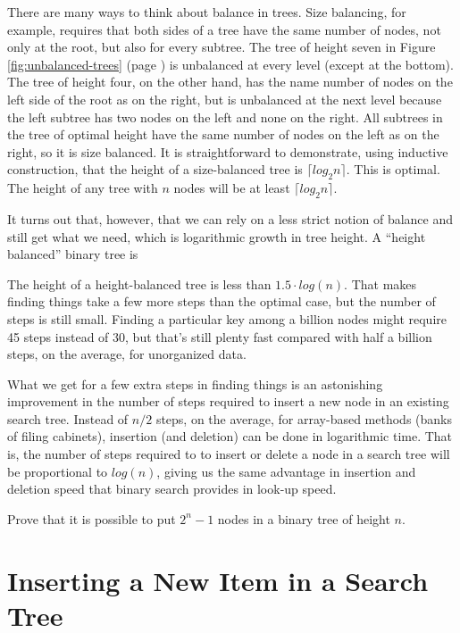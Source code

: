There are many ways to think about balance in trees.
Size balancing, for example, requires that both sides of
a tree have the same number of nodes, not only at the root,
but also for every subtree.
The tree of height seven in
Figure \ref{fig:unbalanced-trees} (page \pageref{fig:unbalanced-trees})
is unbalanced at every level (except at the bottom).
The tree of height four, on the other hand,
has the name number of nodes on the left side of the root as on the right,
but is unbalanced at the next level because
the left subtree has two nodes on the left and none on the right.
All subtrees in the tree of optimal height have
the same number of nodes on the left as on the right, so it
is size balanced. It is straightforward to demonstrate,
using inductive construction, that
the height of a size-balanced tree is $\lceil log_2 n \rceil$.
This is optimal.
The height of any tree with $n$ nodes will be at least $\lceil log_2 n \rceil$.

It turns out that, however, that we can rely on a less strict
notion of balance and still get what we need, which is logarithmic
growth in tree height.
A ``height balanced'' binary tree is


The height of a height-balanced tree is less than $1.5 \cdot log(n)$.
That makes finding things take a few more
steps than the optimal case, but the number of steps is still small.
Finding a particular key among a billion nodes
might require 45 steps instead of 30, but that's
still plenty fast compared with half a billion steps,
on the average, for unorganized data.

What we get for a few extra steps in finding things is
an astonishing improvement in the number of steps required
to insert a new node in an existing search tree.
Instead of $n/2$ steps, on the average,
for array-based methods (banks of filing cabinets),
insertion (and deletion) can be done in logarithmic time.
That is, the number of steps required to to insert or delete
a node in a search tree will be proportional to $log(n)$,
giving us the same advantage in insertion and deletion speed
that binary search provides in look-up speed.

\begin{ExerciseList}
\Exercise Prove that it is possible to put $2^n - 1$ nodes
in a binary tree of height $n$.
\end{ExerciseList}

\section{Inserting a New Item in a Search Tree}

